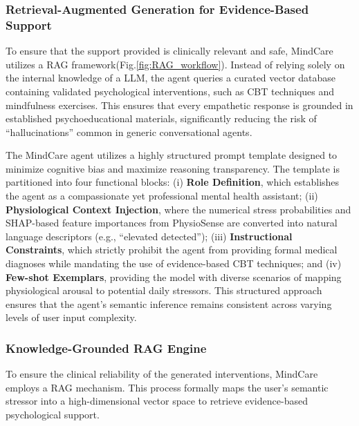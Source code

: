 \documentclass[journal,twoside,web]{ieeecolor}
\begin{document}
\subsubsection{Retrieval-Augmented Generation for Evidence-Based Support}
To ensure that the support provided is clinically relevant and safe, MindCare utilizes a RAG framework(Fig.\ref{fig:RAG_workflow}). Instead of relying solely on the internal knowledge of a LLM, the agent queries a curated vector database containing validated psychological interventions, such as CBT techniques and mindfulness exercises. This ensures that every empathetic response is grounded in established psychoeducational materials, significantly reducing the risk of ``hallucinations'' common in generic conversational agents.

The MindCare agent utilizes a highly structured prompt template designed to minimize cognitive bias and maximize reasoning transparency. The template is partitioned into four functional blocks: 
(i) \textbf{Role Definition}, which establishes the agent as a compassionate yet professional mental health assistant; 
(ii) \textbf{Physiological Context Injection}, where the numerical stress probabilities and SHAP-based feature importances from PhysioSense are converted into natural language descriptors (e.g., ``elevated detected''); 
(iii) \textbf{Instructional Constraints}, which strictly prohibit the agent from providing formal medical diagnoses while mandating the use of evidence-based CBT techniques; and 
(iv) \textbf{Few-shot Exemplars}, providing the model with diverse scenarios of mapping physiological arousal to potential daily stressors. This structured approach ensures that the agent's semantic inference remains consistent across varying levels of user input complexity.

\subsubsection{Knowledge-Grounded RAG Engine}
To ensure the clinical reliability of the generated interventions, MindCare employs a RAG mechanism. This process formally maps the user's semantic stressor into a high-dimensional vector space to retrieve evidence-based psychological support. 
\end{document}
